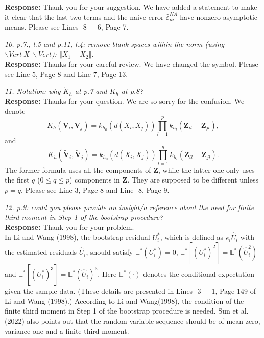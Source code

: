 \documentclass[12pt]{report}
\begin{document}
\begin{description}
{ \bf Response: } Thank you for your suggestion. We have added a statement to make it clear that the last two terms and the naive error $\hat{\varepsilon}^{NA}_{ni}$ have nonzero asymptotic means. Please see Lines -8 -- -6, Page 7.\\

\item {{ \textcolor[rgb]{0.00,0.50,1.00}{\em 10.  p.7., l.5 and p.11, l.4: remove blank spaces within the norm (using $\backslash Vert \ X \ \backslash Vert$): $\Vert X_1-X_2 \Vert$.}}}\\

{ \bf Response: } Thanks for your careful review. We have changed the symbol. Please see Line 5, Page 8 and Line 7, Page 13.\\

\item {{ \textcolor[rgb]{0.00,0.50,1.00}{\em 11. Notation: why $\check{K}_h$ at p.7 and $K_h$ at p.8? }}}\\

{ \bf Response: }Thanks for your question.  We are so sorry for the confusion. We denote
$$\check{K}_{h}(\mathbf{V}_{i},\mathbf{V}_{j})=k_{h_{0}}(d(X_{i},X_{j}))\displaystyle\prod_{l=1}^{p}k_{h_{l}}(\mathbf{Z}_{il}-\mathbf{Z}_{jl}),$$
and
$$K_{h}(\mathbf{\tilde{V}}_{i},\mathbf{\tilde{V}}_{j})=k_{h_{0}}(d(X_{i},X_{j}))\displaystyle\prod_{l=1}^{q}k_{h_{l}}(\mathbf{Z}_{il}-\mathbf{Z}_{jl}).$$
The former formula uses all the components of $\mathbf{Z}$, while the latter one only uses the first $q$ ($0 \leq q \leq p$) components in $\mathbf{Z}$. They are supposed to be different unless $p=q$. Please see Line 3, Page 8 and Line -8, Page 9.
\\

\item {{ \textcolor[rgb]{0.00,0.50,1.00}{\em 12.  p.9: could you please provide an insight/a reference about the need for finite third moment
in Step 1 of the bootstrap procedure?}}}\\

{ \bf Response: } Thank you for your problem. \\

In Li and Wang (1998), the  bootstrap residual $U_i^*$, which is defined as $e_i \hat{U}_i$ with the estimated residuals  $\hat{U}_i$, should satisfy $\mathbb{E}^*(U_i^*)=0$,  $\mathbb{E}^*[(U_i^*)^2]=\mathbb{E}^*(\hat{U}_i^2)$ and $\mathbb{E}^*[(U_i^*)^3]=\mathbb{E}^*(\hat{U}_i)^3$. Here
$\mathbb{E}^*(\cdot)$ denotes the conditional expectation given the sample data. (These details are presented in Lines -3 -- -1, Page 149 of Li and Wang (1998).) According to Li and Wang(1998), the condition of the  finite third moment
in Step 1 of the bootstrap procedure is needed. Sun et al. (2022) also points out that the random variable sequence should be of mean zero,
variance one and a finite third moment.\\



\end{description}
\end{document}
